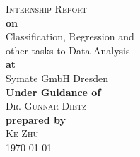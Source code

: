 \begin{titlepage}
\begin{center}
\textsc {\LARGE Internship Report}\\[8em]
\textbf {\small {on}}\\
\textrm {\huge {Classification, Regression and\\
other tasks to Data Analysis}}\\[2em]
\small {\textbf{at}}\\
\large{Symate GmbH Dresden}\\[2em]
\textbf {\small {Under Guidance of}}\\
\textsc{Dr. Gunnar Dietz}\\[2em]
\small {\textbf{prepared by}}\\
\textsc{Ke Zhu}\\
{\today}
\end{center}
\end{titlepage}
